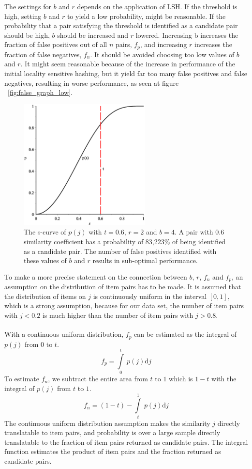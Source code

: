 The settings for \(b\) and \(r\) depends on the application of LSH. If the threshold is high, setting \(b\) and \(r\) to yield a low probability, might be reasonable. If the probability that a pair satisfying the threshold is identified as a candidate pair should be high, \(b\) should be increased and \(r\) lowered. Increasing b increases the fraction of false positives out of all \(n\) pairs, \(f_p\), and increasing \(r\) increases the fraction of false negatives, \(f_n\). It should be avoided choosing too low values of \(b\) and \(r\). It might seem reasonable because of the increase in performance of the initial locality sensitive hashing, but it yield far too many false positives and false negatives, resulting in worse performance, as seen at figure ~\ref{fig:false_graph_low}.

\begin{figure}[H]
	\centering
	\includegraphics[width=250px]{img/pGraphLow.eps}
	\caption{The s-curve of \(p(j)\) with \(t = 0.6\), \(r = 2\) and \(b =4\). A pair with 0.6 similarity coefficient has a probability of 83,223\% of being identified as a candidate pair. The number of false positives identified with these values of \(b\) and \(r\) results in sub-optimal performance.} 
	\label{fig:p_graph_low}
\end{figure}

To make a more precise statement on the connection between \(b\), \(r\), \(f_n\) and \(f_p\), an assumption on the distribution of item pairs has to be made. It is assumed that the distribution of items on \(j\) is continuously uniform in the interval \([0, 1]\), which is a strong assumption, because for our data set, the number of item pairs with \(j<0.2\) is much higher than the number of item pairs with \(j>0.8\).\\ \\
With a continuous uniform distribution, \(f_p\) can be estimated as the integral of \(p(j)\) from 0 to \(t\).
\[f_p = \int\limits_0^t\ p(j)\mathrm{d}j\]
To estimate \(f_n\), we subtract the entire area from \(t\) to \(1\) which is \(1-t\) with the integral of \(p(j)\) from \(t\) to \(1\).
\[f_n = (1-t)-\int\limits_t^1\ p(j)\mathrm{d}j\]
The continuous uniform distribution assumption makes the similarity \(j\) directly translatable to item pairs, and probability is over a large sample directly translatable to the fraction of item pairs returned as candidate pairs. The integral function estimates the product of item pairs and the fraction returned as candidate pairs.


